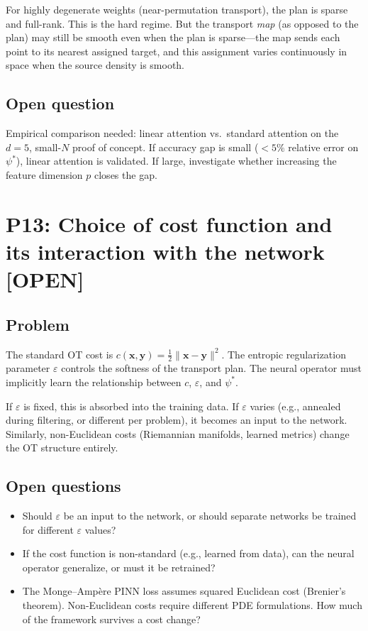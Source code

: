 \documentclass[11pt]{article}
\newcommand{\bx}{\mathbf{x}}
\newcommand{\by}{\mathbf{y}}
\newcommand{\statusopen}{\textcolor{open}{\textbf{[OPEN]}}}
\begin{document}
For highly degenerate weights (near-permutation transport), the plan is sparse and full-rank. This is the hard regime. But the transport \emph{map} (as opposed to the plan) may still be smooth even when the plan is sparse---the map sends each point to its nearest assigned target, and this assignment varies continuously in space when the source density is smooth.

\subsection*{Open question}
Empirical comparison needed: linear attention vs.\ standard attention on the $d = 5$, small-$N$ proof of concept. If accuracy gap is small ($<5\%$ relative error on $\psi^*$), linear attention is validated. If large, investigate whether increasing the feature dimension $p$ closes the gap.

\section{P13: Choice of cost function and its interaction with the network \statusopen}

\subsection*{Problem}
The standard OT cost is $c(\bx, \by) = \frac{1}{2}\|\bx - \by\|^2$. The entropic regularization parameter $\varepsilon$ controls the softness of the transport plan. The neural operator must implicitly learn the relationship between $c$, $\varepsilon$, and $\psi^*$.

If $\varepsilon$ is fixed, this is absorbed into the training data. If $\varepsilon$ varies (e.g., annealed during filtering, or different per problem), it becomes an input to the network. Similarly, non-Euclidean costs (Riemannian manifolds, learned metrics) change the OT structure entirely.

\subsection*{Open questions}
\begin{itemize}[nosep,leftmargin=1.5em]
    \item Should $\varepsilon$ be an input to the network, or should separate networks be trained for different $\varepsilon$ values?
    \item If the cost function is non-standard (e.g., learned from data), can the neural operator generalize, or must it be retrained?
    \item The Monge--Amp\`ere PINN loss assumes squared Euclidean cost (Brenier's theorem). Non-Euclidean costs require different PDE formulations. How much of the framework survives a cost change?
\end{itemize}
\end{document}
